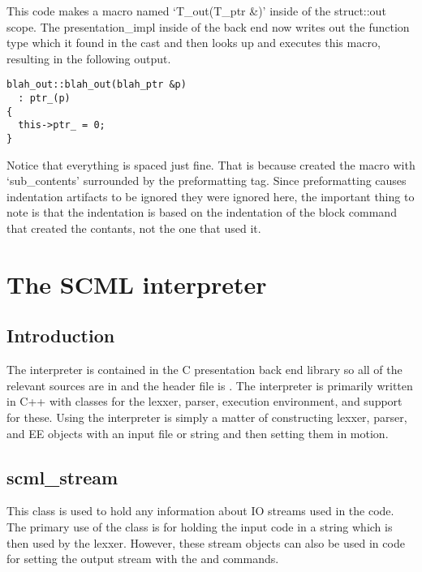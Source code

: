 This code makes a macro named `T\_out(T\_ptr \&)' inside of the struct::out
scope.  The presentation\_impl inside of the back end now writes out the
function type which it found in the cast and then looks up and executes
this macro, resulting in the following output.

\begin{verbatim}
blah_out::blah_out(blah_ptr &p)
  : ptr_(p)
{
  this->ptr_ = 0;
}
\end{verbatim}

Notice that everything is spaced just fine.  That is because
 created the macro with `sub\_contents' surrounded by the
preformatting tag.  Since preformatting causes indentation artifacts to be
ignored they were ignored here, the important thing to note is that the
indentation is based on the indentation of the block command that created
the contants, not the one that used it.

\section{The SCML interpreter}

\subsection{Introduction}

The \SCML{} interpreter is contained in the C presentation back end library so all
of the relevant sources are in  and the header
file is .  The interpreter is primarily written in C++
with classes for the lexxer, parser, execution environment, and support for
these.  Using the interpreter is simply a matter of constructing lexxer,
parser, and EE objects with an input file or string and then setting them in
motion.

\subsection{scml\_stream}

This class is used to hold any information about IO streams used in the code.
The primary use of the class is for holding the input \SCML{} code in a string
which is then used by the lexxer.  However, these stream objects can also be
used in \SCML{} code for setting the output stream with the
 and  commands.

